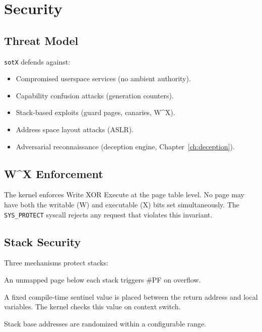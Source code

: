 \documentclass[11pt,a4paper,twoside]{report}
\theoremstyle{definition}
\newcommand{\sotX}{\texttt{sotX}}
\newcommand{\sotX}{\texttt{sotX}}
\newcommand{\syscall}[1]{\texttt{#1}}
\begin{document}
\chapter{Security}
\label{ch:security}

\section{Threat Model}

\sotX{} defends against:
\begin{itemize}[leftmargin=1.4em]
  \item Compromised userspace services (no ambient authority).
  \item Capability confusion attacks (generation counters).
  \item Stack-based exploits (guard pages, canaries, W\^{}X).
  \item Address space layout attacks (ASLR).
  \item Adversarial reconnaissance (deception engine, Chapter~\ref{ch:deception}).
\end{itemize}

\section{W\^{}X Enforcement}

The kernel enforces Write XOR Execute at the page table level. No page may
have both the writable (W) and executable (X) bits set simultaneously. The
\syscall{SYS\_PROTECT} syscall rejects any request that violates this
invariant.

\section{Stack Security}

Three mechanisms protect stacks:
\begin{description}[leftmargin=1.4em]
  \item[Guard pages.] An unmapped page below each stack triggers \#PF on
    overflow.
  \item[Stack canaries.] A fixed compile-time sentinel value is placed
    between the return address and local variables. The kernel checks this
    value on context switch.
  \item[ASLR.] Stack base addresses are randomized within a configurable
    range.
\end{description}
\end{document}
